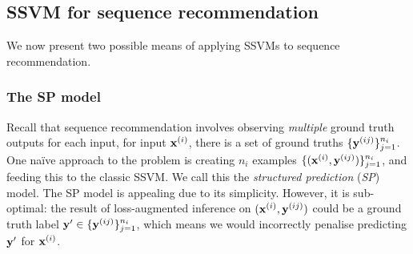 \subsection{SSVM for sequence recommendation}
\label{ssec:sr}

We now present two possible means of applying SSVMs to sequence recommendation.

\subsubsection{The SP model}
Recall that sequence recommendation
involves observing \emph{multiple} ground truth outputs for each input, \ie
for input $\mathbf{x}^{({i})}$, there is a set of ground truths $\{\mathbf{y}^{({ij})}\}_{j=1}^{n_i}$.
One na\"{i}ve approach to the problem
is creating
$n_i$ examples $\{(\mathbf{x}^{({i})}, \mathbf{y}^{({ij})})\}_{j=1}^{n_i}$,
and feeding this to the classic SSVM. %
We call this the \emph{structured prediction} (\emph{SP}) model.
%
The SP model is appealing due to its simplicity.
However, it is sub-optimal:
the result of loss-augmented inference on $(\mathbf{x}^{({i})}, \mathbf{y}^{({ij})})$ could be a ground truth label $\mathbf{y}' \in \{\mathbf{y}^{({ij})}\}_{j=1}^{n_i}$,
which means we would incorrectly penalise predicting $\mathbf{y}'$ for $\mathbf{x}^{({i})}$.

